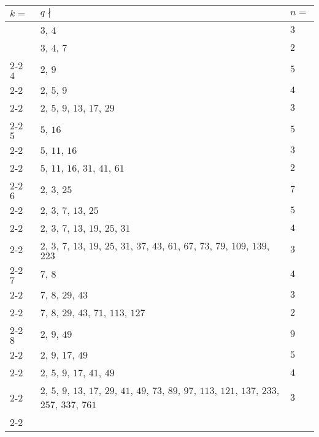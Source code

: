 \documentclass[11pt,reqno]{amsart}
\begin{document}
\begin{longtable}{ | p{1.8cm} | p{12cm} | p{1.8cm} | }
\hline
\boldmath$k=$ &  \boldmath$q \nmid $ & \boldmath$n=$\\
\hline \hline
\multirow{2}{*}{} $3$ & $3$, $4$ & $3$ \\ \cline{2-2} \cline{3-3} 
                  	         & $3$, $4$, $7$ & $2$ \\ \cline{2-2} \cline{3-3} \hline  \hline
\multirow{3}{*}{} $4$ & $2$, $9$ & $5$ \\ \cline{2-2} \cline{3-3} 
                  	         & $2$, $5$, $9$ & $4$ \\ \cline{2-2} \cline{3-3} 
                  	         & $2$, $5$, $9$, $13$, $17$, $29$ & $3$ \\ \cline{2-2}  \cline{3-3} \hline  \hline
\multirow{3}{*}{} $5$ & $5$, $16$ & $5$ \\ \cline{2-2} \cline{3-3} 
                  	         & $5$, $11$, $16$ & $3$ \\ \cline{2-2} \cline{3-3} 
                  	         & $5$, $11$, $16$, $31$, $41$, $61$ & $2$ \\ \cline{2-2}  \cline{3-3} \hline  \hline	      
\multirow{4}{*}{} $6$ & $2$, $3$, $25$ & $7$ \\ \cline{2-2} \cline{3-3} 
					    & $2$, $3$, $7$, $13$, $25$ & $5$ \\ \cline{2-2} \cline{3-3} 
                  	         & $2$, $3$, $7$, $13$, $19$, $25$, $31$ & $4$ \\ \cline{2-2} \cline{3-3} 
                  	         & $2$, $3$, $7$, $13$, $19$, $25$, $31$, $37$, $43$, $61$, $67$, $73$, $79$, $109$, $139$, $223$  & $3$ \\  \cline{2-2}  \cline{3-3} \hline  \hline
\multirow{3}{*}{} $7$ &  $7$, $8$ & $4$  \\ \cline{2-2} \cline{3-3} 
                  	         &  $7$, $8$, $29$, $43$ & $3$ \\ \cline{2-2} \cline{3-3} 
                  	         &  $7$, $8$, $29$, $43$, $71$, $113$, $127$ & $2$ \\ \cline{2-2}  \cline{3-3} \hline  \hline
\multirow{4}{*}{} $8$ &  $2$, $9$, $49$ & $9$ \\ \cline{2-2} \cline{3-3} 
                  	       &  $2$, $9$, $17$, $49$ & $5$ \\ \cline{2-2} \cline{3-3} 
	      			  &  $2$, $5$, $9$, $17$, $41$, $49$ & $4$ \\ \cline{2-2}  \cline{3-3}
                  	      &  $2$, $5$, $9$, $13$, $17$, $29$, $41$, $49$, $73$, $89$, $97$, $113$, $121$, $137$, $233$, $257$, $337$, $761$ & $3$ \\ \cline{2-2}  \cline{3-3} \hline  \hline

\end{longtable}
\end{document}
